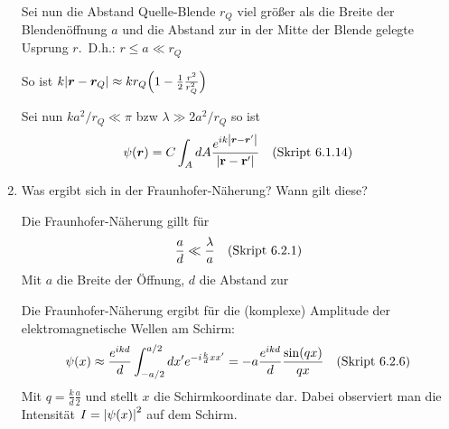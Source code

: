 \begin{enumerate}
    Sei nun die Abstand Quelle-Blende $r_Q$ viel größer als die 
    Breite der Blendenöffnung $a$ und die Abstand zur in der Mitte 
    der Blende gelegte Usprung $r$.\ D.h.: 
    $r\le a \ll r_Q$

    So ist 
    $k\abs{\vb* r -\vb* r_Q}\approx kr_Q\qty(1-\frac{1}{2}\frac{r^2}{r^2_Q})$

    Sei nun $ka^2/r_Q\ll \pi$ bzw $\lambda \gg 2a^2/r_Q$ so ist
    \begin{equation*}
      \psi(\vb* r)=C\int_A dA \frac{e^{ik\abs{\vb* r-\vb* r'}}}{\abs{\vb{r}-\vb{r}'}}\quad\text{(Skript 6.1.14)}
    \end{equation*}

  \item Was ergibt sich in der Fraunhofer-Näherung? Wann gilt diese? %

    Die Fraunhofer-Näherung gillt für
    \begin{equation*}
      \frac{a}{d} \ll \frac{\lambda}{a} \quad\text{(Skript 6.2.1)}
    \end{equation*}
    Mit $a$ die Breite der Öffnung, $d$ die Abstand zur 

    Die Fraunhofer-Näherung ergibt für die (komplexe) Amplitude der
    elektromagnetische Wellen am Schirm:
    \begin{equation*}
      \psi(x)\approx \frac{e^{ikd}}{d}\int_{-a/2}^{a/2}dx'
      e^{-i \frac{k}{d}xx'}
      =
      -a \frac{e^{ikd}}{d} \frac{\sin(qx)}{qx} 
      \quad\text{(Skript 6.2.6)}
    \end{equation*}
    Mit $q=\frac{k}{d} \frac{a}{2}$ und stellt $x$ die Schirmkoordinate dar.
    Dabei observiert man die Intensität $I=\abs{\psi(x)}^2$ auf dem Schirm.

\end{enumerate}
